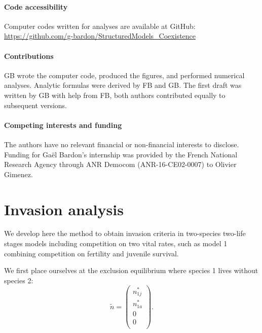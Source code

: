 \documentclass{article}
\begin{document}
\paragraph{Code accessibility}
Computer codes written for analyses are available at GitHub:\\
\url{https://github.com/g-bardon/StructuredModels_Coexistence}

\paragraph{Contributions}
GB wrote the computer code, produced the figures, and performed numerical analyses. Analytic formulas were derived by FB and GB. The first draft was written by GB with help from FB, both authors contributed equally to subsequent versions. 

\paragraph{Competing interests and funding}
The authors have no relevant financial or non-financial interests to disclose. Funding for Gaël Bardon's internship was provided by the French National Research Agency through ANR Democom (ANR-16-CE02-0007) to Olivier Gimenez.


 

\newpage

\appendix

\setcounter{equation}{0}
\renewcommand{\theequation}{A\arabic{equation}}

\setcounter{table}{0}
\renewcommand{\thetable}{A\arabic{table}}

\setcounter{figure}{0}
\renewcommand{\thefigure}{A\arabic{figure}}

\setcounter{section}{0}
\renewcommand{\thesection}{Appendix \arabic{section}}



\section{Invasion analysis}\label{app:inv_analysis}

We develop here the method to obtain invasion criteria in two-species two-life stages models including competition on two vital rates, such as model 1 combining competition on fertility and juvenile survival.

We first place ourselves at the exclusion equilibrium where species 1 lives without species 2:
\begin{equation}
    \tilde{n}= \begin{pmatrix}
    n_{1j}^*\\n_{1a}^*\\0\\0\\
    \end{pmatrix}.
\end{equation}
\end{document}
